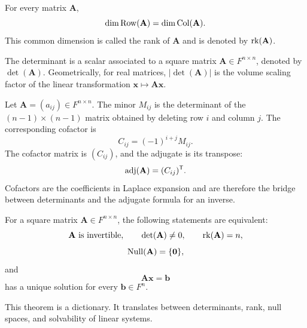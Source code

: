     \begin{theorem}
        For every matrix $\mathbf{A}$,
        \[
            \dim\operatorname{Row}(\mathbf{A})
            =
            \dim\operatorname{Col}(\mathbf{A}).
        \]
        This common dimension is called the rank of $\mathbf{A}$ and is denoted
        by $\operatorname{rk}(\mathbf{A})$.
    \end{theorem}

    \begin{definition}[Determinant]
        The determinant is a scalar associated to a square matrix
        $\mathbf{A}\in F^{n\times n}$, denoted by $\det(\mathbf{A})$.
        Geometrically, for real matrices, $|\det(\mathbf{A})|$ is the volume
        scaling factor of the linear transformation
        $\mathbf{x}\mapsto\mathbf{A}\mathbf{x}$.
    \end{definition}

    \begin{definition}
        Let $\mathbf{A}=(a_{ij})\in F^{n\times n}$. The minor $M_{ij}$ is the
        determinant of the $(n-1)\times(n-1)$ matrix obtained by deleting row
        $i$ and column $j$. The corresponding cofactor is
        \[
            C_{ij}=(-1)^{i+j}M_{ij}.
        \]
        The cofactor matrix is $(C_{ij})$, and the adjugate is its transpose:
        \[
            \operatorname{adj}(\mathbf{A})=(C_{ij})^{\mathsf T}.
        \]
        Cofactors are the coefficients in Laplace expansion and are therefore
        the bridge between determinants and the adjugate formula for an inverse.
    \end{definition}

    \begin{theorem}
        For a square matrix $\mathbf{A}\in F^{n\times n}$, the following
        statements are equivalent:
        \[
            \mathbf{A}\text{ is invertible},
            \qquad
            \det(\mathbf{A})\neq 0,
            \qquad
            \operatorname{rk}(\mathbf{A})=n,
        \]
        \[
            \operatorname{Null}(\mathbf{A})=\{\mathbf{0}\},
        \]
        and
        \[
            \mathbf{A}\mathbf{x}=\mathbf{b}
        \]
        has a unique solution for every $\mathbf{b}\in F^n$.
    \end{theorem}

    \begin{remark}
        This theorem is a dictionary. It translates between determinants, rank,
        null spaces, and solvability of linear systems.
    \end{remark}

